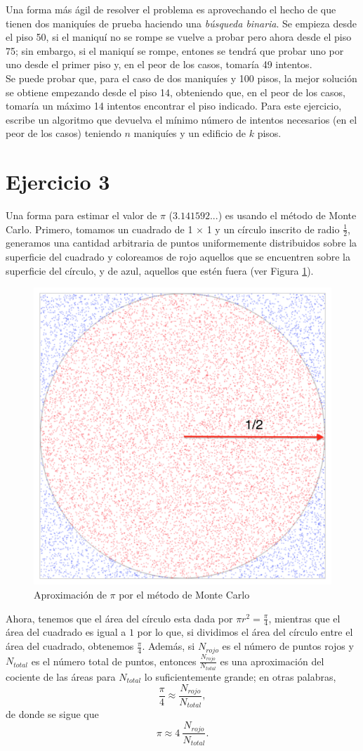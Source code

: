 \documentclass[a4paper]{article}
\begin{document}
Una forma más ágil de resolver el problema es aprovechando el hecho de que tienen dos maniquíes de prueba haciendo una \textit{búsqueda binaria}. Se empieza desde el piso 50, si el maniquí no se rompe se vuelve a probar pero ahora desde el piso 75; sin embargo, si el maniquí se rompe, entones se tendrá que probar uno por uno desde el primer piso y, en el peor de los casos, tomaría 49 intentos. \\

Se puede probar que, para el caso de dos maniquíes y 100 pisos, la mejor solución se obtiene empezando desde el piso 14, obteniendo que, en el peor de los casos, tomaría un máximo 14 intentos encontrar el piso indicado. Para este ejercicio, escribe un algoritmo que devuelva el mínimo número de intentos necesarios (en el peor de los casos) teniendo $n$ maniquíes y un edificio de $k$ pisos.

\newpage
\section*{Ejercicio 3} \label{Sec: Ejercicio 3}

Una forma para estimar el valor de $\pi$ ($3.141592...$) es usando el método de Monte Carlo. Primero, tomamos un cuadrado de 1 $\times$ 1 y un círculo inscrito de radio $\frac{1}{2}$, generamos una cantidad arbitraria de puntos uniformemente distribuidos sobre la superficie del cuadrado y coloreamos de rojo aquellos que se encuentren sobre la superficie del círculo, y de azul, aquellos que estén fuera  (ver Figura \ref{fig:pi}).

\begin{figure}[h!]
    \centering
    \includegraphics[width=.4\linewidth]{img/pi.png}
    \caption{Aproximación de $\pi$ por el método de Monte Carlo}
    \label{fig:pi}
\end{figure}

Ahora, tenemos que el área del círculo esta dada por $\pi r^2 = \frac{\pi}{4}$, mientras que el área del cuadrado es igual a $1$ por lo que, si dividimos el área del círculo entre el área del cuadrado, obtenemos $\frac{\pi}{4}$. Además, si $N_{rojo}$ es el número de puntos rojos y $N_{total}$ es el número total de puntos, entonces $\frac{N_{rojo}}{N_{total}}$ es una aproximación del cociente de las áreas para $N_{total}$ lo suficientemente grande; en otras palabras,
\[
    \frac{\pi}{4} \approx \frac{N_{rojo}}{N_{total}},
\] 
de donde se sigue que
\begin{equation}\label{eq: Monte Carlo}
    \pi \approx 4\ \frac{N_{rojo}}{N_{total}}.
\end{equation}
    
\end{document}
